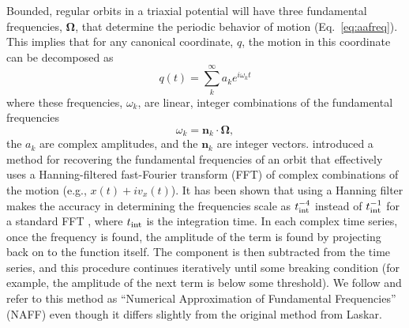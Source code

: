 \documentclass[letterpaper,12pt,preprint]{aastex}
\newcommand{\bs}[1]{\boldsymbol{#1}}
\newcommand{\inttime}{t_{\rm int}}
\begin{document}
Bounded, regular orbits in a triaxial potential will have three fundamental frequencies, $\bs{\Omega}$, that determine the periodic behavior of motion (Eq.~\ref{eq:aafreq}). This implies that for any canonical coordinate, $q$, the motion in this coordinate can be decomposed as 
\begin{equation}
	q(t) = \sum^\infty_k a_k e^{i \omega_k t}
\end{equation}
where these frequencies, $\omega_k$, are linear, integer combinations of the fundamental frequencies
\begin{equation}
	\omega_k = \bs{n}_k \cdot \bs{\Omega},
\end{equation}
the $a_k$ are complex amplitudes, and the $\bs{n}_k$ are integer vectors. \cite{laskar93} introduced a method for recovering the fundamental frequencies of an orbit that effectively uses a Hanning-filtered fast-Fourier transform (FFT) of complex combinations of the motion (e.g., $x(t) + i v_x(t)$). It has been shown that using a Hanning filter makes the accuracy in determining the frequencies scale as $\inttime^{-4}$ instead of $\inttime^{-1}$ for a standard FFT \citep{laskar99}, where $\inttime$ is the integration time. In each complex time series, once the frequency is found, the amplitude of the term is found by projecting back on to the function itself. The component is then subtracted from the time series, and this procedure continues iteratively until some breaking condition (for example, the amplitude of the next term is below some threshold). We follow \cite{valluri98} and refer to this method as ``Numerical Approximation of Fundamental Frequencies'' (NAFF) even though it differs slightly from the original method from Laskar.
\end{document}

